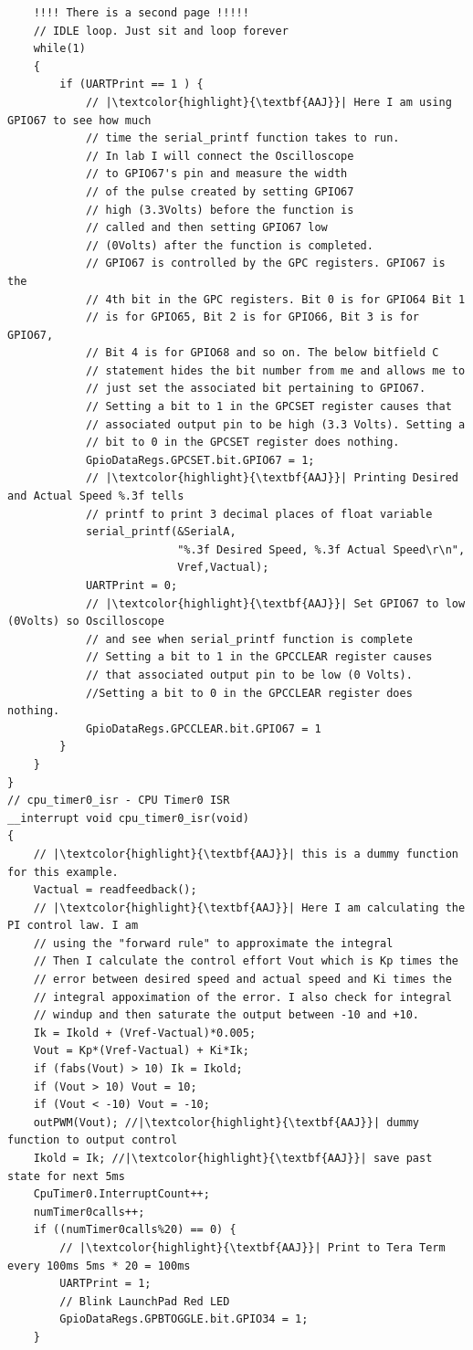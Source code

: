 \documentclass[11pt]{article}
\begin{document}
\begin{verbatim}
    !!!! There is a second page !!!!!
    // IDLE loop. Just sit and loop forever
    while(1)
    {
        if (UARTPrint == 1 ) {
            // |\textcolor{highlight}{\textbf{AAJ}}| Here I am using GPIO67 to see how much
            // time the serial_printf function takes to run.
            // In lab I will connect the Oscilloscope
            // to GPIO67's pin and measure the width
            // of the pulse created by setting GPIO67
            // high (3.3Volts) before the function is
            // called and then setting GPIO67 low
            // (0Volts) after the function is completed.
            // GPIO67 is controlled by the GPC registers. GPIO67 is the
            // 4th bit in the GPC registers. Bit 0 is for GPIO64 Bit 1
            // is for GPIO65, Bit 2 is for GPIO66, Bit 3 is for GPIO67,
            // Bit 4 is for GPIO68 and so on. The below bitfield C
            // statement hides the bit number from me and allows me to
            // just set the associated bit pertaining to GPIO67.
            // Setting a bit to 1 in the GPCSET register causes that
            // associated output pin to be high (3.3 Volts). Setting a
            // bit to 0 in the GPCSET register does nothing.
            GpioDataRegs.GPCSET.bit.GPIO67 = 1;
            // |\textcolor{highlight}{\textbf{AAJ}}| Printing Desired and Actual Speed %.3f tells
            // printf to print 3 decimal places of float variable
            serial_printf(&SerialA,
                          "%.3f Desired Speed, %.3f Actual Speed\r\n",
                          Vref,Vactual);
            UARTPrint = 0;
            // |\textcolor{highlight}{\textbf{AAJ}}| Set GPIO67 to low (0Volts) so Oscilloscope
            // and see when serial_printf function is complete
            // Setting a bit to 1 in the GPCCLEAR register causes
            // that associated output pin to be low (0 Volts).
            //Setting a bit to 0 in the GPCCLEAR register does nothing.
            GpioDataRegs.GPCCLEAR.bit.GPIO67 = 1
        }
    }
}
// cpu_timer0_isr - CPU Timer0 ISR
__interrupt void cpu_timer0_isr(void)
{
    // |\textcolor{highlight}{\textbf{AAJ}}| this is a dummy function for this example.
    Vactual = readfeedback();
    // |\textcolor{highlight}{\textbf{AAJ}}| Here I am calculating the PI control law. I am
    // using the "forward rule" to approximate the integral
    // Then I calculate the control effort Vout which is Kp times the
    // error between desired speed and actual speed and Ki times the
    // integral appoximation of the error. I also check for integral
    // windup and then saturate the output between -10 and +10.
    Ik = Ikold + (Vref-Vactual)*0.005;
    Vout = Kp*(Vref-Vactual) + Ki*Ik;
    if (fabs(Vout) > 10) Ik = Ikold;
    if (Vout > 10) Vout = 10;
    if (Vout < -10) Vout = -10;
    outPWM(Vout); //|\textcolor{highlight}{\textbf{AAJ}}| dummy function to output control
    Ikold = Ik; //|\textcolor{highlight}{\textbf{AAJ}}| save past state for next 5ms
    CpuTimer0.InterruptCount++;
    numTimer0calls++;
    if ((numTimer0calls%20) == 0) {
        // |\textcolor{highlight}{\textbf{AAJ}}| Print to Tera Term every 100ms 5ms * 20 = 100ms
        UARTPrint = 1;
        // Blink LaunchPad Red LED
        GpioDataRegs.GPBTOGGLE.bit.GPIO34 = 1;
    }


\end{verbatim}
\end{document}
